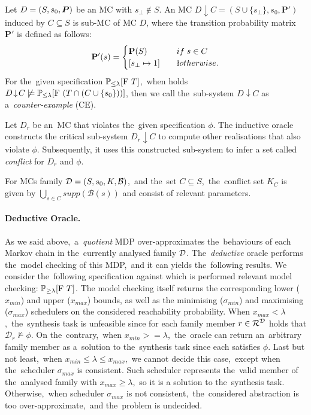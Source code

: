 \begin{definition}
Let $D = (S,s_{0},\boldsymbol{P})$ be an MC with $s_{\bot} \notin S$.
An MC $D \! \downarrow \! C = (S \cup \{ s_{\bot} \}, s_0, \mathbf{P}')$ induced by $C \subseteq S$ is sub-MC of MC $D$, where the transition probability matrix $\mathbf{P}'$ is defined as follows:
\begin{align*}
    \mathbf{P}'(s) = 
    \begin{cases}
        \mathbf{P}(S) \quad & if \; s \in C \\
        [ s_{\bot} \mapsto 1 ] \quad & \l otherwise.  
    \end{cases}
\end{align*}
For the~given specification $\mathbb{P}_{\leq \lambda}[\mathrm{F}\ T]$,~when holds $D \! \downarrow \! C \not \models \mathbb{P}_{\leq \lambda}[\mathrm{F}\ (T \cap (C \cup \{ s_0 \}))]$, then we call the~sub-system $D \! \downarrow \! C$ as a~\textit{counter-example} (CE).
\end{definition}

Let $D_r$ be an~MC that violates the~given specification $\phi$.
The inductive oracle constructs the critical sub-system $D_r \! \downarrow \! C$ to compute other realisations that also violate $\phi$.
Subsequently, it uses this constructed sub-system to infer a set called \textit{conflict} for $D_r$ and $\phi$.

\begin{definition}[Conflict]
For MCs family $\mathcal{D} = (S,s_{0},K,\mathcal{B})$,~and the~set $C \subseteq S$,~the~conflict set $K_C$ is given by $\bigcup_{s \in C} supp(\mathcal{B}(s))$ and consist of relevant parameters.
\end{definition}

\paragraph{Deductive Oracle.}
As we said above,~a~\textit{quotient} MDP over-approximates the~behaviours of each Markov chain in the~currently analysed family $\mathcal{D}$.
The~\textit{deductive} oracle performs the~model checking of this MDP,~and it can yields the~following results.
We consider the~following specification against which is performed relevant model checking: $\mathbb{P}_{\geq \lambda}[\mathrm{F}\ T]$.
The model checking itself returns the corresponding lower ($x_{min}$) and upper ($x_{max}$) bounds, as well as the minimising ($\sigma_{min}$) and maximising ($\sigma_{max}$) schedulers on the considered reachability probability.
When $x_{max} < \lambda$,~the~synthesis task is unfeasible since for each family member $r \in \mathcal{R}^{\mathcal{D}}$ holds that $\mathcal{D}_r \not\models \phi$.
On the~contrary,~when $x_{min} >= \lambda$,~the~oracle can return an~arbitrary family member as a~solution to the~synthesis task since each satisfies $\phi$.
Last but not least,~when $x_{min} \leq \lambda \leq x_{max}$,~we cannot decide this case,~except when the~scheduler $\sigma_{max}$ is consistent.
Such scheduler represents the~valid member of the~analysed family with $x_{max} \geq \lambda$,~so it is a solution to the~synthesis task.
Otherwise,~when scheduler $\sigma_{max}$ is not consistent,~the~considered abstraction is too over-approximate,~and the~problem is undecided.

